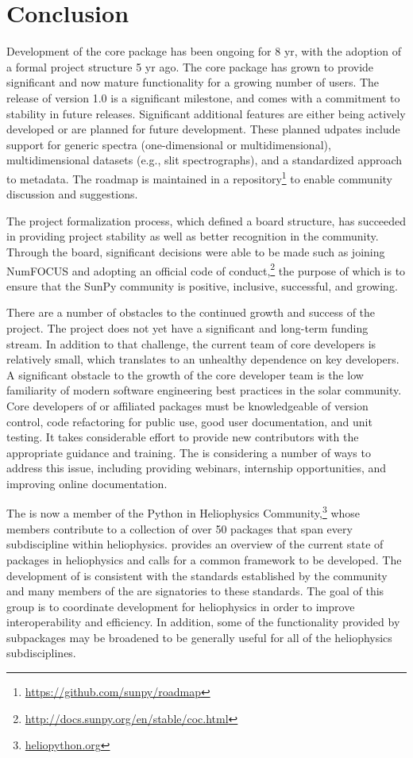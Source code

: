 \section{Conclusion}
\label{sec:conclusion}

Development of the \sunpypkg core package has been ongoing for 8 yr, with the adoption of a formal project structure 5 yr ago.
The core package has grown to provide significant and now mature functionality for a growing number of users.
The release of version 1.0 is a significant milestone, and comes with a commitment to stability in future releases.
Significant additional features are either being actively developed or are planned for future development.
These planned udpates include support for generic spectra (one-dimensional or multidimensional), multidimensional datasets (e.g., slit spectrographs), and a standardized approach to metadata. The roadmap is maintained in a repository\footnote{\url{https://github.com/sunpy/roadmap}} to enable community discussion and suggestions.

The project formalization process, which defined a board structure, has succeeded in providing project stability as well as better recognition in the community.
Through the board, significant decisions were able to be made such as joining NumFOCUS and adopting an official code of conduct,\footnote{\url{http://docs.sunpy.org/en/stable/coc.html}} the purpose of which is to ensure that the SunPy community is positive, inclusive, successful, and growing.

There are a number of obstacles to the continued growth and success of the project.
The project does not yet have a significant and long-term funding stream.
In addition to that challenge, the current team of core developers is relatively small, which translates to an unhealthy dependence on key developers.
A significant obstacle to the growth of the core developer team is the low familiarity of modern software engineering best practices in the solar community.
Core developers of \sunpypkg or affiliated packages must be knowledgeable of version control, code refactoring for public use, good user documentation, and unit testing.
It takes considerable effort to provide new contributors with the appropriate guidance and training.
The \sunpyproj is considering a number of ways to address this issue, including providing webinars, internship opportunities, and improving online documentation.

The \sunpyproj is now a member of the Python in Heliophysics Community,\footnote{\url{heliopython.org}} whose members contribute to a collection of over 50 \python packages that span every subdiscipline within heliophysics.
\citet{snakes} provides an overview of the current state of \python packages in heliophysics and calls for a common framework to be developed.
The development of \sunpypkg is consistent with the standards established by the community \citep{pyhcStandards} and many members of the \sunpyproj are signatories to these standards.
The goal of this group is to coordinate \python development for heliophysics in order to improve interoperability and efficiency.
In addition, some of the functionality provided by \sunpypkg subpackages may be broadened to be generally useful for all of the heliophysics subdisciplines.
